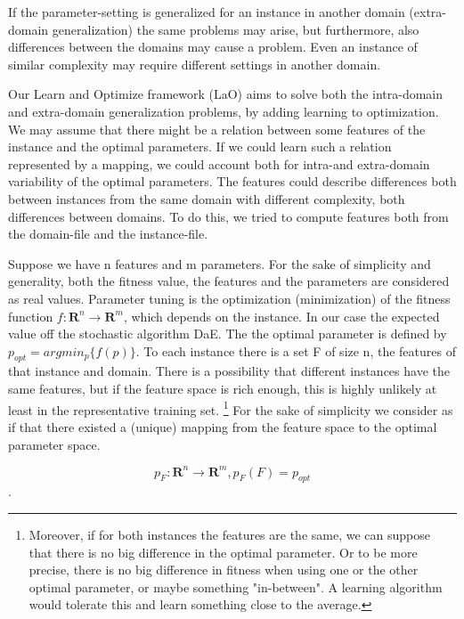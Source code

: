 \documentclass{article}
\begin{document}
If the parameter-setting is generalized for an instance in another domain (extra-domain generalization) the same problems may arise, but furthermore, also differences between the domains may cause a problem. Even an instance of similar complexity may require different settings in another domain.

Our Learn and Optimize framework (LaO) aims to solve both the intra-domain and extra-domain generalization problems, by adding learning to optimization. We may assume that there might be a relation between some features of the instance and the optimal parameters. If we could learn such a relation represented by a mapping, we could account both for intra-and extra-domain variability of the optimal parameters. The features could describe differences both between instances from the same domain with different complexity, both differences between domains. To do this, we tried to compute features both from the domain-file and the instance-file.

Suppose we have n features and m parameters. For the sake of simplicity and generality, both the fitness value, the features and the parameters are considered as real values. Parameter tuning is the optimization (minimization) of the fitness function \begin{math}f:\mathbf{R}^n\to \mathbf{R}^m \end{math}, which depends on the instance. In our case the expected value off the stochastic algorithm DaE. The the optimal parameter is defined by \begin{math} p_{opt}=argmin_p\{f(p)\} \end{math}. To each instance there is a set F of size n, the features of that instance and domain. There is a possibility that different instances have the same features, but if the feature space is rich enough, this is highly unlikely at least in the representative training set. \footnote{Moreover, if for both instances the features are the same, we can suppose that there is no big difference in the optimal parameter. Or to be more precise, there is no big difference in fitness when using one or the other optimal parameter, or maybe something "in-between". A learning algorithm would tolerate this and learn something close to the average.} For the sake of simplicity we consider as if that there existed a (unique) mapping from the feature space to the optimal parameter space.

\begin{equation} p_F: \mathbf{R}^n \to \mathbf{R}^m, p_F(F)=p_{opt} \end{equation}.	
\end{document}
